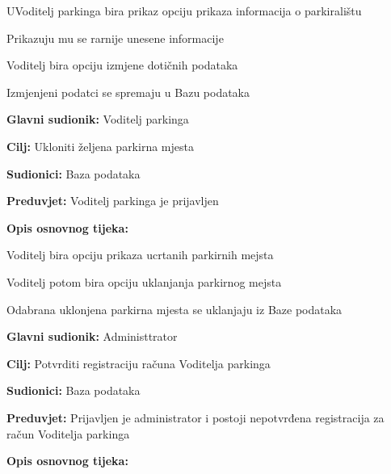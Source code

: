 \begin{packed_item}
\begin{packed_item}
\begin{packed_item}
\begin{packed_enum}
							\item UVoditelj parkinga bira prikaz opciju prikaza informacija o parkiralištu
							\item Prikazuju mu se rarnije unesene informacije
							\item Voditelj bira opciju izmjene dotičnih podataka 
                                \item Izmjenjeni podatci se spremaju u Bazu podataka
							
						\end{packed_enum}
					\end{packed_item}


                        \noindent {}
					\begin{packed_item}
	
						\item \textbf{Glavni sudionik: }Voditelj parkinga
						\item  \textbf{Cilj:} Ukloniti željena parkirna mjesta
						\item  \textbf{Sudionici:} Baza podataka
						\item  \textbf{Preduvjet:} Voditelj parkinga je prijavljen
						\item  \textbf{Opis osnovnog tijeka:}
						
						\item[] \begin{packed_enum}
	
							\item Voditelj bira opciju prikaza ucrtanih parkirnih mejsta
							\item Voditelj potom bira opciju uklanjanja parkirnog mejsta
							\item Odabrana uklonjena parkirna mjesta se uklanjaju iz Baze podataka
							
						\end{packed_enum}

        
					\end{packed_item}

                        \noindent {}
					\begin{packed_item}
	
						\item \textbf{Glavni sudionik: }Administtrator
						\item  \textbf{Cilj:} Potvrditi registraciju računa Voditelja parkinga
						\item  \textbf{Sudionici:} Baza podataka
						\item  \textbf{Preduvjet:} Prijavljen je administrator i postoji nepotvrđena registracija za račun Voditelja parkinga
						\item  \textbf{Opis osnovnog tijeka:}
						

\end{packed_item}
\end{packed_item}
\end{packed_item}
